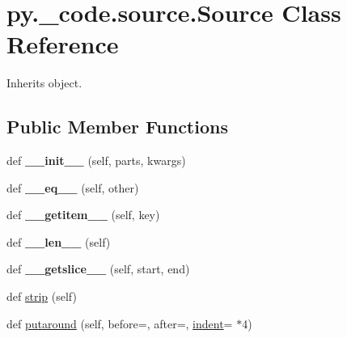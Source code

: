 \hypertarget{classpy_1_1__code_1_1source_1_1_source}{}\section{py.\+\_\+code.\+source.\+Source Class Reference}
\label{classpy_1_1__code_1_1source_1_1_source}


Inherits object.

\subsection*{Public Member Functions}
\begin{DoxyCompactItemize}
\item 
\mbox{\label{classpy_1_1__code_1_1source_1_1_source_abf62c397b9921b006f16bdc2133e43e7}} 
def {\bfseries \+\_\+\+\_\+init\+\_\+\+\_\+} (self, parts, kwargs)
\item 
\mbox{\label{classpy_1_1__code_1_1source_1_1_source_a380af9160b9770853449bf79e99ad88b}} 
def {\bfseries \+\_\+\+\_\+eq\+\_\+\+\_\+} (self, other)
\item 
\mbox{\label{classpy_1_1__code_1_1source_1_1_source_a7d0a0d96323d7c76b9c90cabdb64629a}} 
def {\bfseries \+\_\+\+\_\+getitem\+\_\+\+\_\+} (self, key)
\item 
\mbox{\label{classpy_1_1__code_1_1source_1_1_source_a4bf4c4321aef46319928f40b54f9b719}} 
def {\bfseries \+\_\+\+\_\+len\+\_\+\+\_\+} (self)
\item 
\mbox{\label{classpy_1_1__code_1_1source_1_1_source_a46296cd755a69be8f8455f72fca27fbb}} 
def {\bfseries \+\_\+\+\_\+getslice\+\_\+\+\_\+} (self, start, end)
\item 
def \hyperlink{classpy_1_1__code_1_1source_1_1_source_ac9490124c30cb66e50bb7e87dbdd029e}{strip} (self)
\item 
def \hyperlink{classpy_1_1__code_1_1source_1_1_source_aa8a2ff562a48539bf3e57203b0e4373a}{putaround} (self, before=\textquotesingle{}\textquotesingle{}, after=\textquotesingle{}\textquotesingle{}, \hyperlink{classpy_1_1__code_1_1source_1_1_source_ae22bab7210f429aa4bd5dcc862169673}{indent}=\textquotesingle{} \textquotesingle{} $\ast$4)

\end{DoxyCompactItemize}
